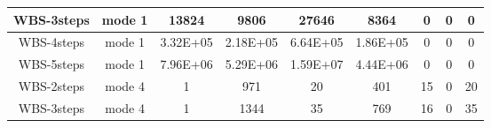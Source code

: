\begin{table}[]
\begin{tabular}{@{}ccccccccc@{}}
        WBS-3steps                                                  & mode 1                                                       & 13824                                                      & 9806                                                         & 27646                                                          & 8364                                                                   & 0                                                             & 0                                                                      & 0        \\ \midrule
        WBS-4steps                                                  & mode 1                                                       & 3.32E+05                                                   & 2.18E+05                                                     & 6.64E+05                                                       & 1.86E+05                                                               & 0                                                             & 0                                                                      & 0        \\ \midrule
        WBS-5steps                                                  & mode 1                                                       & 7.96E+06                                                   & 5.29E+06                                                     & 1.59E+07                                                       & 4.44E+06                                                               & 0                                                             & 0                                                                      & 0        \\ \midrule
        WBS-2steps                                                  & mode 4                                                       & 1                                                          & 971                                                          & 20                                                             & 401                                                                    & 15                                                            & 0                                                                      & 20       \\ \midrule
        WBS-3steps                                                  & mode 4                                                       & 1                                                          & 1344                                                         & 35                                                             & 769                                                                    & 16                                                            & 0                                                                      & 35       \\ \midrule

\end{tabular}
\end{table}
